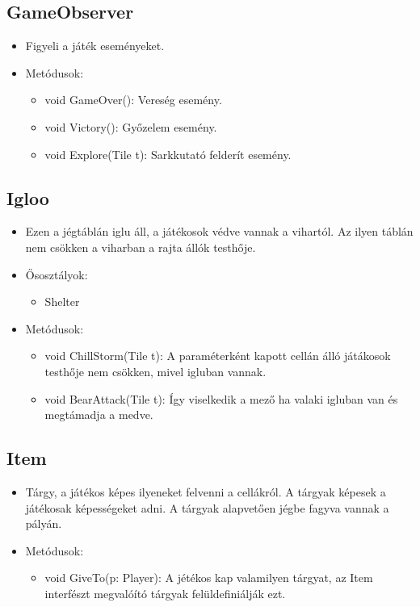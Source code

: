 \subsection{GameObserver}
\begin{itemize}
	\item Figyeli a játék eseményeket.
	\item Metódusok:
	\begin{itemize}
		\item void GameOver(): Vereség esemény.
		\item void Victory(): Győzelem esemény.
		\item void Explore(Tile t): Sarkkutató felderít esemény.
	\end{itemize}
\end{itemize}

\subsection{Igloo}
\begin{itemize}
	\item Ezen a jégtáblán iglu áll, a játékosok védve vannak a vihartól. Az ilyen táblán nem csökken a viharban a rajta állók testhője.
	\item Ősosztályok:
	\begin{itemize} 
		\item Shelter
	\end{itemize}
	\item Metódusok:
	\begin{itemize}
		\item void ChillStorm(Tile t): A paraméterként kapott cellán álló játákosok testhője nem csökken, mivel igluban vannak.
		\item void BearAttack(Tile t): Így viselkedik a mező ha valaki igluban van és megtámadja a medve.
	\end{itemize}
\end{itemize}

\subsection{Item}
\begin{itemize}
	\item Tárgy, a játékos képes ilyeneket felvenni a cellákról. A tárgyak képesek a játékosak képességeket adni. A tárgyak alapvetően jégbe fagyva vannak a pályán.
	\item Metódusok:
	\begin{itemize}
		\item void GiveTo(p: Player): A jétékos kap valamilyen tárgyat, az Item interfészt megvalóító tárgyak felüldefiniálják ezt.
	\end{itemize}
\end{itemize}

